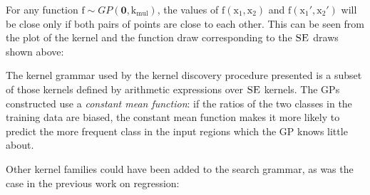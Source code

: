 \documentclass[a4paper,12pt ]{report}
\renewcommand{\GP}{{GP}}
\begin{document}
For any function $\mathrm{f} \sim \GP(\bm{0}, \mathrm{k_{mul}})$, the values of $\mathrm{f(x_1, x_2)}$ and $\mathrm{f(x_1', x_2')}$ will be close only if both pairs of points are close to each other. This can be seen from the plot of the kernel and the function draw corresponding to the $\textsc{SE}$ draws shown above:

\begin{center}

\end{center}

The kernel grammar used by the kernel discovery procedure presented is a subset of those kernels defined by arithmetic expressions over $\textsc{SE}$ kernels. The GPs constructed use a \emph{constant mean function}: if the ratios of the two classes in the training data are biased, the constant mean function makes it more likely to predict the more frequent class in the input regions which the GP knows little about. %


Other kernel families could have been added to the search grammar, as was the case in the previous work on regression:
\end{document}
